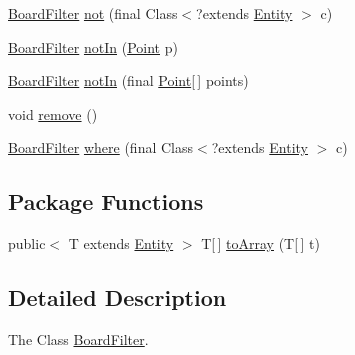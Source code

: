 \begin{DoxyCompactItemize}
\item 
\hyperlink{classjdungeon_1_1core_1_1world_1_1filter_1_1_board_filter}{BoardFilter} \hyperlink{classjdungeon_1_1core_1_1world_1_1filter_1_1_board_filter_a3ca4c9854511f8b65c57ec39142ae50f}{not} (final Class$<$?extends \hyperlink{classjdungeon_1_1core_1_1world_1_1_entity}{Entity} $>$ c)
\item 
\hyperlink{classjdungeon_1_1core_1_1world_1_1filter_1_1_board_filter}{BoardFilter} \hyperlink{classjdungeon_1_1core_1_1world_1_1filter_1_1_board_filter_a67f4fa3c42470dc5d3c3130f9f6348dc}{notIn} (\hyperlink{classjdungeon_1_1core_1_1world_1_1_point}{Point} p)
\item 
\hyperlink{classjdungeon_1_1core_1_1world_1_1filter_1_1_board_filter}{BoardFilter} \hyperlink{classjdungeon_1_1core_1_1world_1_1filter_1_1_board_filter_a323e75b3160508aec98f28f8f5e780b0}{notIn} (final \hyperlink{classjdungeon_1_1core_1_1world_1_1_point}{Point}\mbox{[}$\,$\mbox{]} points)
\item 
void \hyperlink{classjdungeon_1_1core_1_1world_1_1filter_1_1_board_filter_a71c8cd38df56da3e639e8354b1a0b99c}{remove} ()
\item 
\hyperlink{classjdungeon_1_1core_1_1world_1_1filter_1_1_board_filter}{BoardFilter} \hyperlink{classjdungeon_1_1core_1_1world_1_1filter_1_1_board_filter_aaa128c13b73053b766383e23b5f2a964}{where} (final Class$<$?extends \hyperlink{classjdungeon_1_1core_1_1world_1_1_entity}{Entity} $>$ c)
\end{DoxyCompactItemize}
\subsection*{Package Functions}
\begin{DoxyCompactItemize}
\item 
public$<$ T extends \hyperlink{classjdungeon_1_1core_1_1world_1_1_entity}{Entity} $>$ T\mbox{[}$\,$\mbox{]} \hyperlink{classjdungeon_1_1core_1_1world_1_1filter_1_1_board_filter_ada50e3d173f68645eb92e38f041ffa5f}{toArray} (T\mbox{[}$\,$\mbox{]} t)
\end{DoxyCompactItemize}


\subsection{Detailed Description}
The Class \hyperlink{classjdungeon_1_1core_1_1world_1_1filter_1_1_board_filter}{BoardFilter}. 

